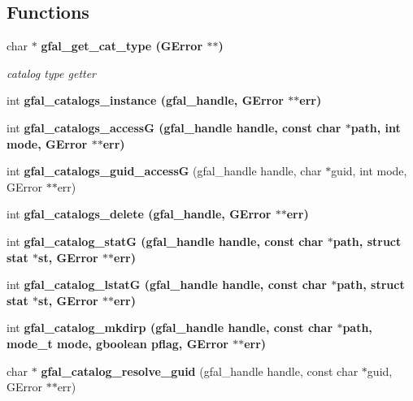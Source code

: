 \subsection*{Functions}
\begin{CompactItemize}
\item 
char $\ast$ \bf{gfal\_\-get\_\-cat\_\-type} (GError $\ast$$\ast$)
\begin{CompactList}\small\item\em catalog type getter \item\end{CompactList}\item 
int \bf{gfal\_\-catalogs\_\-instance} (gfal\_\-handle, GError $\ast$$\ast$err)
\item 
int \bf{gfal\_\-catalogs\_\-access\-G} (gfal\_\-handle handle, const char $\ast$path, int mode, GError $\ast$$\ast$err)
\item 
int \textbf{gfal\_\-catalogs\_\-guid\_\-access\-G} (gfal\_\-handle handle, char $\ast$guid, int mode, GError $\ast$$\ast$err)\label{gfal__common__catalog_8h_fdd144370f8c6df2564eaddbf26e2fd5}

\item 
int \bf{gfal\_\-catalogs\_\-delete} (gfal\_\-handle, GError $\ast$$\ast$err)
\item 
int \bf{gfal\_\-catalog\_\-stat\-G} (gfal\_\-handle handle, const char $\ast$path, struct stat $\ast$st, GError $\ast$$\ast$err)
\item 
int \bf{gfal\_\-catalog\_\-lstat\-G} (gfal\_\-handle handle, const char $\ast$path, struct stat $\ast$st, GError $\ast$$\ast$err)
\item 
int \bf{gfal\_\-catalog\_\-mkdirp} (gfal\_\-handle handle, const char $\ast$path, mode\_\-t mode, gboolean pflag, GError $\ast$$\ast$err)
\item 
char $\ast$ \textbf{gfal\_\-catalog\_\-resolve\_\-guid} (gfal\_\-handle handle, const char $\ast$guid, GError $\ast$$\ast$err)\label{gfal__common__catalog_8h_4955825d7c275f3dfae9a57232642370}


\end{CompactItemize}
